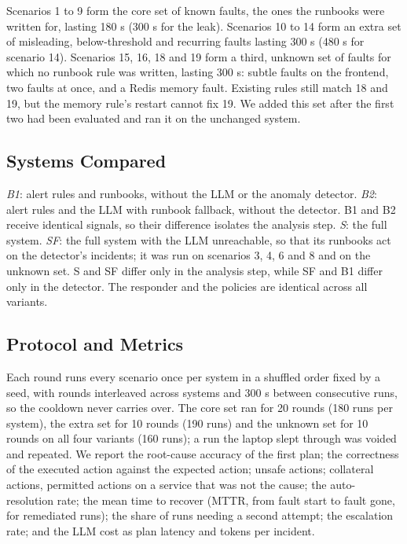 \documentclass[conference,a4paper]{IEEEtran}
\begin{document}
Scenarios 1 to 9 form the core set of known faults, the ones the runbooks were written for, lasting 180 s (300 s for the leak). Scenarios 10 to 14 form an extra set of misleading, below-threshold and recurring faults lasting 300 s (480 s for scenario 14). Scenarios 15, 16, 18 and 19 form a third, unknown set of faults for which no runbook rule was written, lasting 300 s: subtle faults on the frontend, two faults at once, and a Redis memory fault. Existing rules still match 18 and 19, but the memory rule's restart cannot fix 19. We added this set after the first two had been evaluated and ran it on the unchanged system.

\subsection{Systems Compared}

\textit{B1}: alert rules and runbooks, without the LLM or the anomaly detector. \textit{B2}: alert rules and the LLM with runbook fallback, without the detector. B1 and B2 receive identical signals, so their difference isolates the analysis step. \textit{S}: the full system. \textit{SF}: the full system with the LLM unreachable, so that its runbooks act on the detector's incidents; it was run on scenarios 3, 4, 6 and 8 and on the unknown set. S and SF differ only in the analysis step, while SF and B1 differ only in the detector. The responder and the policies are identical across all variants.

\subsection{Protocol and Metrics}

Each round runs every scenario once per system in a shuffled order fixed by a seed, with rounds interleaved across systems and 300 s between consecutive runs, so the cooldown never carries over. The core set ran for 20 rounds (180 runs per system), the extra set for 10 rounds (190 runs) and the unknown set for 10 rounds on all four variants (160 runs); a run the laptop slept through was voided and repeated. We report the root-cause accuracy of the first plan; the correctness of the executed action against the expected action; unsafe actions; collateral actions, permitted actions on a service that was not the cause; the auto-resolution rate; the mean time to recover (MTTR, from fault start to fault gone, for remediated runs); the share of runs needing a second attempt; the escalation rate; and the LLM cost as plan latency and tokens per incident.
\end{document}

